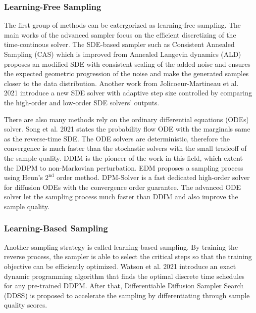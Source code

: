 \documentclass[12pt,DIV14,BCOR12mm,a4paper,footinclude=false,headinclude,parskip=half-,twoside,openright,cleardoublepage=empty,toc=index,bibliography=totoc,listof=totoc]{scrreprt}
\numberwithin{equation}{chapter}
\begin{document}
\subsubsection{Learning-Free Sampling}
The first group of methods can be catergorized as learning-free sampling. The main works of the advanced sampler focus on the efficient discretizing of the time-continous solver. The SDE-based sampler such as Consistent Annealed Sampling (CAS) \cite{jolicoeurmartineau2020adversarial} which is improved from Annealed Langevin dynamics (ALD) \cite{dockhorn2022scorebased} proposes an modified SDE with consistent scaling of the added noise and ensures the expected geometric progression of the noise and make the generated samples closer to the data distribution. Another work from Jolicoeur-Martineau et al. 2021 \cite{jolicoeurmartineau2021gotta} introduce a new SDE solver with adaptive step size controlled by comparing the high-order and low-order SDE solvers' outputs.

There are also many methods rely on the ordinary differential equations (ODEs) solver. Song et al. 2021 \cite{song2021scorebased} states the probability flow ODE with the marginals same as the reverse-time SDE. The ODE solvers are deterministic, therefore the convergence is much faster than the stochastic solvers with the small tradeoff of the sample quality. DDIM \cite{song2022denoising} is the pioneer of the work in this field, which extent the DDPM to non-Markovian perturbation. EDM proposes a sampling process using Heun's $2^{\text{nd}}$ order method. DPM-Solver \cite{lu2022dpmsolver} is a fast dedicated high-order solver for diffusion ODEs with the convergence order guarantee. The advanced ODE solver let the sampling process much faster than DDIM and also improve the sample quality.

\subsubsection{Learning-Based Sampling}
Another sampling strategy is called learning-based sampling. By training the reverse process, the sampler is able to select the critical steps so that the training objective can be efficiently optimized. Watson et al. 2021 \cite{watson2021learning} introduce an exact dynamic programming algorithm that finds the optimal discrete time schedules for any pre-trained DDPM. After that, Differentiable Diffusion Sampler Search (DDSS) \cite{watson2022learning} is proposed to accelerate the sampling by differentiating through sample quality scores. 
\end{document}
